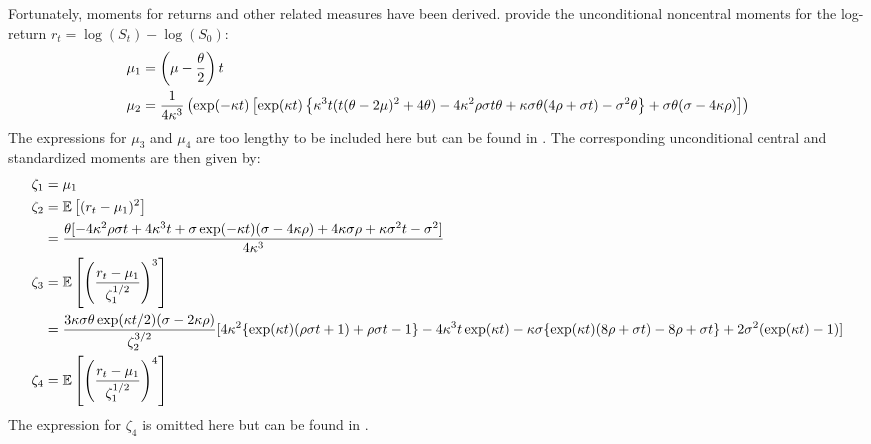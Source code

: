 Fortunately, moments for returns and other related measures have been derived. \cite{okhrinSimulatingCoxIngersoll2022} provide the unconditional noncentral moments for the log-return $r_t = \log(S_t) - \log(S_0)$:
\begin{align}
    \mu_1 &= \left(\mu - \frac{\theta}{2}\right)t\notag \\
    \mu_2 &= \frac{1}{4\kappa^3}\left(\exp(-\kappa t)\left[\exp(\kappa t)\left\lbrace\kappa^3 t(t(\theta-2\mu)^2 + 4\theta) - 4\kappa^2\rho\sigma t\theta + \kappa\sigma\theta(4\rho + \sigma t) - \sigma^2\theta\right\rbrace + \sigma\theta(\sigma-4\kappa\rho)\right]\right) \notag
\end{align}
The expressions for $\mu_3$ and $\mu_4$ are too lengthy to be included here but can be found in \cite{okhrinSimulatingCoxIngersoll2022}. The corresponding unconditional central and standardized moments are then given by:
\begin{align}
    \zeta_1 &= \mu_1\notag \\
    \zeta_2 &= \mathbb{E}\left[(r_t-\mu_1)^2\right] \notag \\
    &= \frac{\theta[-4\kappa^2\rho\sigma t + 4\kappa^3 t + \sigma\exp(-\kappa t)(\sigma - 4\kappa\rho) + 4\kappa\sigma\rho + \kappa\sigma^2 t - \sigma^2]}{4\kappa^3} \notag \\
    \zeta_3 &= \mathbb{E}\left[\left(\frac{r_t-\mu_1}{\zeta_1^{1/2}}\right)^3\right] \notag \\
    &= \frac{3\kappa\sigma\theta\exp(\kappa t/2)(\sigma - 2\kappa\rho)}{\zeta_2^{3/2}}[4\kappa^2\{\exp(\kappa t)(\rho\sigma t+1) + \rho\sigma t - 1\} - 4\kappa^3 t\exp(\kappa t) - \kappa\sigma\{\exp(\kappa t)(8\rho + \sigma t) - 8\rho + \sigma t\} + 2\sigma^2(\exp(\kappa t)-1)] \notag \\
    \zeta_4 &= \mathbb{E}\left[\left(\frac{r_t-\mu_1}{\zeta_1^{1/2}}\right)^4\right] \notag
\end{align}
The expression for $\zeta_4$ is omitted here but can be found in \cite{okhrinSimulatingCoxIngersoll2022}.

